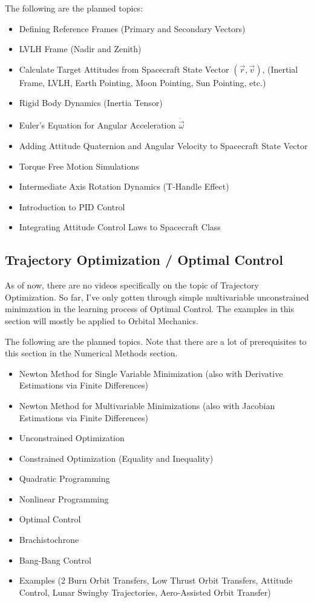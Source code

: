 \documentclass{article}
\begin{document}
\noindent
The following are the planned topics:

\begin{itemize}
	\item Defining Reference Frames (Primary and Secondary Vectors)
	\item LVLH Frame (Nadir and Zenith)
	\item Calculate Target Attitudes from Spacecraft State Vector \color{magenta}$(\vec{r},\vec{v})$\color{white}, (Inertial Frame, LVLH, Earth Pointing, Moon Pointing, Sun Pointing, etc.)
	\item Rigid Body Dynamics (Inertia Tensor)
	\item Euler's Equation for Angular Acceleration \color{magenta}$\dot{\vec{\omega}}$\color{white}
	\item Adding Attitude Quaternion and Angular Velocity to Spacecraft State Vector
	\item Torque Free Motion Simulations
	\item Intermediate Axis Rotation Dynamics (T-Handle Effect)
	\item Introduction to PID Control
	\item Integrating Attitude Control Laws to Spacecraft Class
\end{itemize}

\clearpage

\subsection{Trajectory Optimization / Optimal Control}
As of now, there are no videos specifically on the topic of Trajectory Optimization. So far, I've only gotten through simple multivariable unconstrained minimzation in the learning process of Optimal Control. The examples in this section will mostly be applied to Orbital Mechanics.


\noindent
The following are the planned topics. Note that there are a lot of prerequisites to this section in the Numerical Methods section.

\begin{itemize}
	\item Newton Method for Single Variable Minimization (also with Derivative Estimations via Finite Differences)
	\item Newton Method for Multivariable Minimizations (also with Jacobian Estimations via Finite Differences)
	\item Unconstrained Optimization
	\item Constrained Optimization (Equality and Inequality)
	\item Quadratic Programming
	\item Nonlinear Programming
	\item Optimal Control
	\item Brachistochrone
	\item Bang-Bang Control
	\item Examples (2 Burn Orbit Transfers, Low Thrust Orbit Transfers, Attitude Control, Lunar Swingby Trajectories, Aero-Assisted Orbit Transfer)
\end{itemize}
\end{document}
